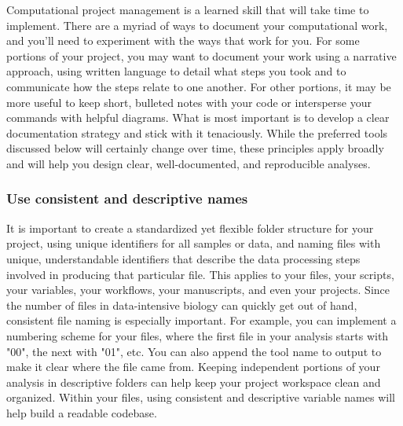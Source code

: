 \documentclass[10pt,letterpaper]{article}
\begin{document}
Computational project management is a learned skill that will take time to implement. There are a myriad of ways to document your computational work, and you'll need to experiment with the ways that work for you. For some portions of your project, you may want to document your work using a narrative approach, using written language to detail what steps you took and to communicate how the steps relate to one another. For other portions, it may be more useful to keep short, bulleted notes with your code or intersperse your commands with helpful diagrams. What is most important is to develop a clear documentation strategy and stick with it tenaciously. While the preferred tools discussed below will certainly change over time, these principles apply broadly and will help you design clear, well-documented, and reproducible analyses.

\subsubsection*{Use consistent and descriptive names}  
It is important to create a standardized yet flexible folder structure for your project, using unique identifiers for all samples or data, and naming files with unique, understandable identifiers that describe the data processing steps involved in producing that particular file. This applies to your files, your scripts, your variables, your workflows, your manuscripts, and even your projects. Since the number of files in data-intensive biology can quickly get out of hand, consistent file naming is especially important. For example, you can implement a numbering scheme for your files, where the first file in your analysis starts with "00", the next with "01", etc. You can also append the tool name to output to make it clear where the file came from. Keeping independent portions of your analysis in descriptive folders can help keep your project workspace clean and organized. Within your files, using consistent and descriptive variable names will help build a readable codebase.
\end{document}
